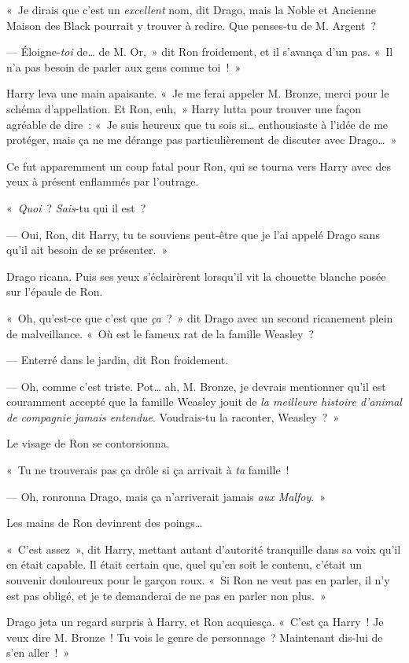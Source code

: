 «~Je dirais que c'est un \emph{excellent} nom, dit Drago, mais la Noble et Ancienne Maison des Black pourrait y trouver à redire. Que penses-tu de M. Argent~?

--- Éloigne-\emph{toi} de… de M. Or,~» dit Ron froidement, et il s'avança d'un pas. «~Il n'a pas besoin de parler aux gens comme toi~!~»

Harry leva une main apaisante. «~Je me ferai appeler M. Bronze, merci pour le schéma d'appellation. Et Ron, euh,~» Harry lutta pour trouver une façon agréable de dire~: «~Je suis heureux que tu sois si… enthousiaste à l'idée de me protéger, mais ça ne me dérange pas particulièrement de discuter avec Drago…~»

Ce fut apparemment un coup fatal pour Ron, qui se tourna vers Harry avec des yeux à présent enflammés par l'outrage.

«~\emph{Quoi}~? \emph{Sais}-tu qui il est~?

--- Oui, Ron, dit Harry, tu te souviens peut-être que je l'ai appelé Drago sans qu'il ait besoin de se présenter.~»

Drago ricana. Puis ses yeux s'éclairèrent lorsqu'il vit la chouette blanche posée sur l'épaule de Ron.

«~Oh, qu'est-ce que c'est que \emph{ça}~?~» dit Drago avec un second ricanement plein de malveillance. «~Où est le fameux rat de la famille Weasley~?

--- Enterré dans le jardin, dit Ron froidement.

--- Oh, comme c'est triste. Pot… ah, M. Bronze, je devrais mentionner qu'il est couramment accepté que la famille Weasley jouit de \emph{la meilleure histoire d'animal de compagnie jamais entendue}. Voudrais-tu la raconter, Weasley~?~»

Le visage de Ron se contorsionna.

«~Tu ne trouverais pas ça drôle si ça arrivait à \emph{ta} famille~!

--- Oh, ronronna Drago, mais ça n'arriverait jamais \emph{aux Malfoy}.~»

Les mains de Ron devinrent des poings…

«~C'est assez~», dit Harry, mettant autant d'autorité tranquille dans sa voix qu'il en était capable. Il était certain que, quel qu'en soit le contenu, c'était un souvenir douloureux pour le garçon roux. «~Si Ron ne veut pas en parler, il n'y est pas obligé, et je te demanderai de ne pas en parler non plus.~»

Drago jeta un regard surpris à Harry, et Ron acquiesça. «~C'est ça Harry~! Je veux dire M. Bronze~! Tu vois le genre de personnage~? Maintenant dis-lui de s'en aller~!~»

